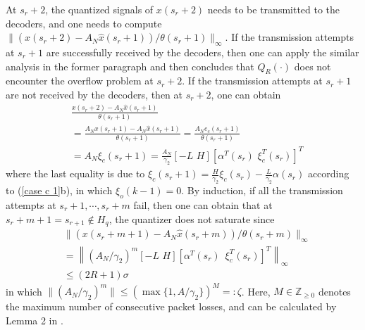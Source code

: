 \documentclass[letterpaper,journal,final,twocolumn]{IEEEtran}
\begin{document}
At $s_r + 2$, the quantized signals of $x(s_r + 2)$ needs to be transmitted to the decoders, and one needs to compute 
$\|
(x(s_r + 2) - A_N \hat x(s_r+1))/\theta (s_r+1) \|_\infty. 
$
If the transmission attempts at $s_r + 1$ are successfully received by the decoders, then one can apply the similar analysis in the former paragraph and then concludes that $Q_R(\cdot)$ does not encounter the overflow problem at $s_r + 2 $.
If the transmission attempts at $s_r + 1$ are not received by the decoders, then at $s_r + 2 $, one can obtain
	\begin{align}
	& \frac{x(s_r + 2) - A_N \hat x(s_r+1)}{\theta (s_r+1)} \nonumber\\
	& = \frac{ A_N  x(s_r + 1)    -A_N  \hat x(s_r + 1 )}{\theta (s_r + 1)}  = \frac{  A_N  e_c(s_r + 1)  }{\theta (s_r + 1)} \nonumber\\
	& = A_N \xi_c (s_r + 1)  = \frac{A_N}{\gamma_2} \left[ -L \,\, H \right]  
[
	\alpha^T(s_r) \,\,
	\xi_c ^T (s_r)
]^T
	\end{align} 
	where the last equality is due to 
	$
	\xi _c (s_r + 1) = \frac{H}{\gamma_2} \xi _c (s_r) - \frac{L}{\gamma_2} \alpha(s_r)
	$
	according to (\ref{case c 1}b), in which $\xi_o(k-1)=0$.
By induction, if all the transmission attempts at $s_r + 1, \cdots, s_r + m $ fail, then one can obtain that at $s_r + m +1= s_{r+1} \notin H_q$, the quantizer does not saturate since 
\begin{align}\label{65}
& \| 
(x(s_r + m+1) - A_N \hat x(s_r+ m) )   /   \theta (s_r+m)
\| _ \infty \nonumber\\
& =\left\| 
( A_N /\gamma_2)^{m} [ -L \,\, H] 
[
\alpha^T(s_r) \,\,\,
\xi_c ^T (s_r)
]
^T  \right\|_\infty
\nonumber\\
& \le (2R+1) \sigma
\end{align} 
in which $\|(A_N/\gamma_2)^{m}\| \le (\max\{1, A/\gamma_2 \})^M =:\zeta$. Here, $M\in \mathbb Z_{\ge 0}$ denotes the maximum number of consecutive packet losses, and can be calculated by Lemma 2 in \cite{feng2020arxiv}.
\end{document}
